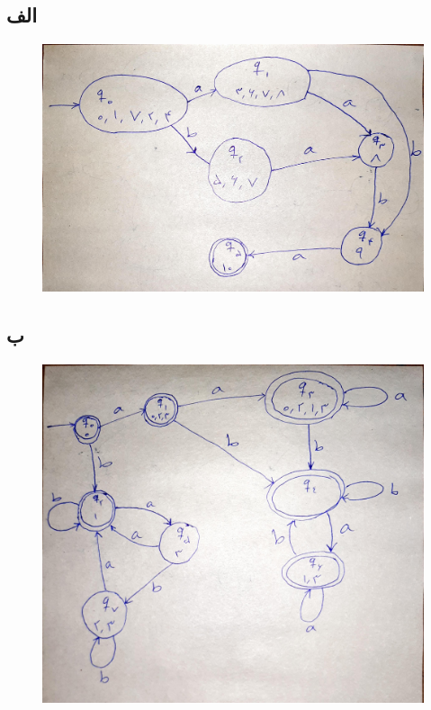 \documentclass{article}
\begin{document}
\section{}%
\subsection{الف}
\begin{figure}[H]
    \centering
    \includegraphics[width=1\textwidth]{figures/4a.jpg}
    \caption
	{}
    \label{fig:fig1}
\end{figure}
\subsection{ب}
\begin{figure}[H]
    \centering
    \includegraphics[width=1\textwidth]{figures/4b.jpg}
    \caption
	{}
    \label{fig:fig1}
\end{figure}
\end{document}
